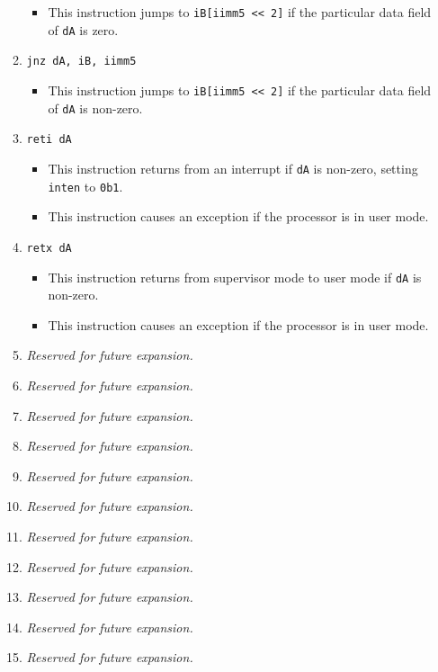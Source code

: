 \documentclass{article}
\begin{document}
\begin{itemize}
\begin{enumerate}
				\begin{itemize}
				\item This instruction jumps to \texttt{iB[iimm5 << 2]}
					if the particular data field of \texttt{dA} is zero.
				\end{itemize}
			\item \texttt{jnz dA, iB, iimm5}
				\begin{itemize}
				\item This instruction jumps to \texttt{iB[iimm5 << 2]}
					if the particular data field of \texttt{dA} is
					non-zero.
				\end{itemize}
			\item \texttt{reti dA}
				\begin{itemize}
				\item This instruction returns from an interrupt if
					\texttt{dA} is non-zero, setting \texttt{inten} to
					\texttt{0b1}.
				\item This instruction causes an exception if the processor
					is in user mode.
				\end{itemize}

			\item \texttt{retx dA}
				\begin{itemize}
				\item This instruction returns from supervisor mode to user
					mode if \texttt{dA} is non-zero.
				\item This instruction causes an exception if the processor
					is in user mode.
				\end{itemize}
			\item \textit{Reserved for future expansion.}
			\item \textit{Reserved for future expansion.}
			\item \textit{Reserved for future expansion.}

			\item \textit{Reserved for future expansion.}
			\item \textit{Reserved for future expansion.}
			\item \textit{Reserved for future expansion.}
			\item \textit{Reserved for future expansion.}

			\item \textit{Reserved for future expansion.}
			\item \textit{Reserved for future expansion.}
			\item \textit{Reserved for future expansion.}
			\item \textit{Reserved for future expansion.}
			\end{enumerate}
		\end{itemize}
		\newpage
\end{document}
